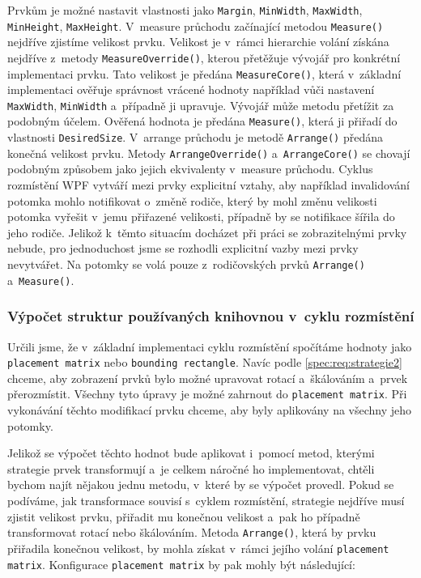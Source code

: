 Prvkům je možné nastavit vlastnosti jako \texttt{Margin}, \texttt{MinWidth}, \texttt{MaxWidth}, \linebreak \texttt{MinHeight}, \texttt{MaxHeight}. V~measure průchodu začínající metodou \texttt{Measure()} \linebreak nejdříve zjistíme velikost prvku. Velikost je v~rámci hierarchie volání získána nejdříve z~metody \texttt{MeasureOverride()}, kterou přetěžuje vývojář pro konkrétní implementaci prvku. Tato velikost je předána \texttt{MeasureCore()}, která v~základní implementaci ověřuje správnost vrácené hodnoty například vůči nastavení \linebreak \texttt{MaxWidth}, \texttt{MinWidth} a~případně ji upravuje. Vývojář může metodu přetížit za podobným účelem. Ověřená hodnota je předána \texttt{Measure()}, která ji přiřadí do vlastnosti \texttt{DesiredSize}. V~arrange průchodu je metodě \texttt{Arrange()} předána konečná velikost prvku. Metody \texttt{ArrangeOverride()} a~\texttt{ArrangeCore()} se chovají podobným způsobem jako jejich ekvivalenty v~measure průchodu. Cyklus rozmístění WPF vytváří mezi prvky explicitní vztahy, aby například invalidování potomka mohlo notifikovat o~změně rodiče, který by mohl změnu velikosti potomka vyřešit v~jemu přiřazené velikosti, případně by se notifikace šířila do jeho rodiče. Jelikož k~těmto situacím docházet při práci se zobrazitelnými prvky nebude, pro jednoduchost jsme se rozhodli explicitní vazby mezi prvky nevytvářet. Na potomky se volá pouze z~rodičovských prvků \texttt{Arrange()} a~\texttt{Measure()}.

\subsubsection*{Výpočet struktur používaných knihovnou v~cyklu rozmístění}
\label{kap3:upravy_zobrazitelnych_prvku_strategiemi}
Určili jsme, že v~základní implementaci cyklu rozmístění spočítáme hodnoty jako \texttt{placement matrix} nebo \texttt{bounding rectangle}. Navíc podle \ref{spec:req:strategie2} chceme, aby zobrazení prvků bylo možné upravovat rotací a~škálováním a~prvek přerozmístit. Všechny tyto úpravy je možné zahrnout do \texttt{placement matrix}. Při vykonávání těchto modifikací prvku chceme, aby byly aplikovány na všechny jeho potomky.

Jelikož se výpočet těchto hodnot bude aplikovat i~pomocí metod, kterými strategie prvek transformují a~je celkem náročné ho implementovat, chtěli bychom najít nějakou jednu metodu, v~které by se výpočet provedl. Pokud se podíváme, jak transformace souvisí s~cyklem rozmístění, strategie nejdříve musí zjistit velikost prvku, přiřadit mu konečnou velikost a~pak ho případně transformovat rotací nebo škálováním. Metoda \texttt{Arrange()}, která by prvku přiřadila konečnou velikost, by mohla získat v~rámci jejího volání \texttt{placement matrix}. Konfigurace \texttt{placement matrix} by pak mohly být následující:

